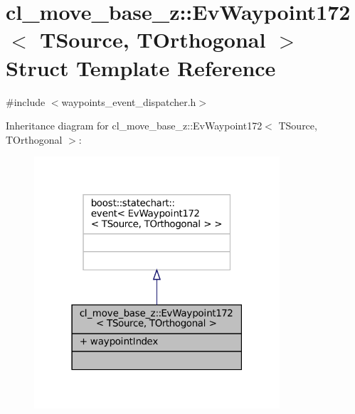 \hypertarget{structcl__move__base__z_1_1EvWaypoint172}{}\section{cl\+\_\+move\+\_\+base\+\_\+z\+:\+:Ev\+Waypoint172$<$ T\+Source, T\+Orthogonal $>$ Struct Template Reference}
\label{structcl__move__base__z_1_1EvWaypoint172}


{\ttfamily \#include $<$waypoints\+\_\+event\+\_\+dispatcher.\+h$>$}



Inheritance diagram for cl\+\_\+move\+\_\+base\+\_\+z\+:\+:Ev\+Waypoint172$<$ T\+Source, T\+Orthogonal $>$\+:
\nopagebreak
\begin{figure}[H]
\begin{center}
\leavevmode
\includegraphics[width=259pt]{structcl__move__base__z_1_1EvWaypoint172__inherit__graph}
\end{center}
\end{figure}


